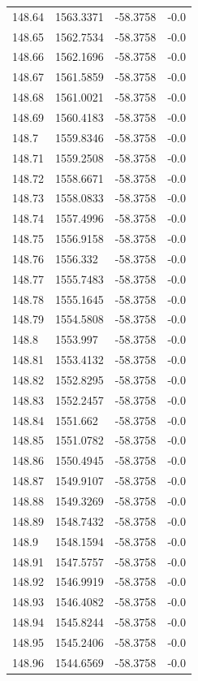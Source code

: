 \begin{table}[H]
\begin{tabular}{llll}
148.64 & 1563.3371 & -58.3758 & -0.0 \\
148.65 & 1562.7534 & -58.3758 & -0.0 \\
148.66 & 1562.1696 & -58.3758 & -0.0 \\
148.67 & 1561.5859 & -58.3758 & -0.0 \\
148.68 & 1561.0021 & -58.3758 & -0.0 \\
148.69 & 1560.4183 & -58.3758 & -0.0 \\
148.7 & 1559.8346 & -58.3758 & -0.0 \\
148.71 & 1559.2508 & -58.3758 & -0.0 \\
148.72 & 1558.6671 & -58.3758 & -0.0 \\
148.73 & 1558.0833 & -58.3758 & -0.0 \\
148.74 & 1557.4996 & -58.3758 & -0.0 \\
148.75 & 1556.9158 & -58.3758 & -0.0 \\
148.76 & 1556.332 & -58.3758 & -0.0 \\
148.77 & 1555.7483 & -58.3758 & -0.0 \\
148.78 & 1555.1645 & -58.3758 & -0.0 \\
148.79 & 1554.5808 & -58.3758 & -0.0 \\
148.8 & 1553.997 & -58.3758 & -0.0 \\
148.81 & 1553.4132 & -58.3758 & -0.0 \\
148.82 & 1552.8295 & -58.3758 & -0.0 \\
148.83 & 1552.2457 & -58.3758 & -0.0 \\
148.84 & 1551.662 & -58.3758 & -0.0 \\
148.85 & 1551.0782 & -58.3758 & -0.0 \\
148.86 & 1550.4945 & -58.3758 & -0.0 \\
148.87 & 1549.9107 & -58.3758 & -0.0 \\
148.88 & 1549.3269 & -58.3758 & -0.0 \\
148.89 & 1548.7432 & -58.3758 & -0.0 \\
148.9 & 1548.1594 & -58.3758 & -0.0 \\
148.91 & 1547.5757 & -58.3758 & -0.0 \\
148.92 & 1546.9919 & -58.3758 & -0.0 \\
148.93 & 1546.4082 & -58.3758 & -0.0 \\
148.94 & 1545.8244 & -58.3758 & -0.0 \\
148.95 & 1545.2406 & -58.3758 & -0.0 \\
148.96 & 1544.6569 & -58.3758 & -0.0 \\

\end{tabular}
\end{table}
